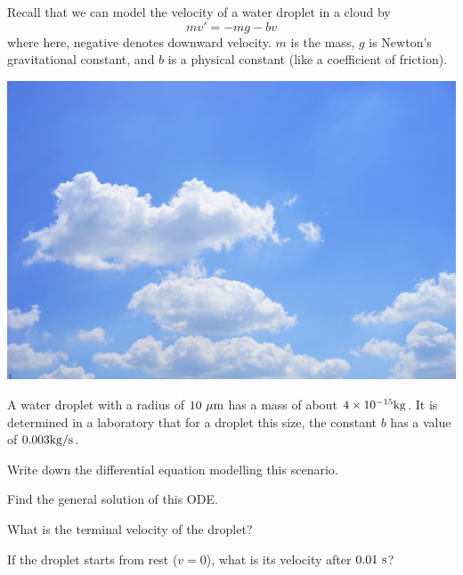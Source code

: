 
\begin{applicationActivities}



\begin{observation}
Recall that we can model the velocity of a water droplet in a cloud by
\[mv'=-mg-bv\]
where here, negative denotes downward velocity.  \(m\) is the mass, \(g\) is Newton's gravitational constant, and \(b\) is a physical constant (like a coefficient of friction).
\begin{center}
\includegraphics[scale=0.2]{media/cloud.jpg}
\end{center}
\end{observation}

\begin{activity}{25}
A water droplet with a radius of \(10\ {\rm \mu m}\) has a mass of about \(4 \times 10^{-15} {\rm kg}\).  It is determined in a laboratory that for a droplet this size, the constant \(b\) has a value of \(0.003 {\rm kg/s}\).
\begin{subactivity}
Write down the differential equation modelling this scenario.
\end{subactivity}
\begin{subactivity}
Find the general solution of this ODE.
\end{subactivity}
\begin{subactivity}
What is the terminal velocity of the droplet?
\end{subactivity}
\begin{subactivity}If the droplet starts from rest (\(v=0\)), what is its velocity after \(0.01\ {\rm s}\)?
\end{subactivity}
\end{activity}


\end{applicationActivities}
